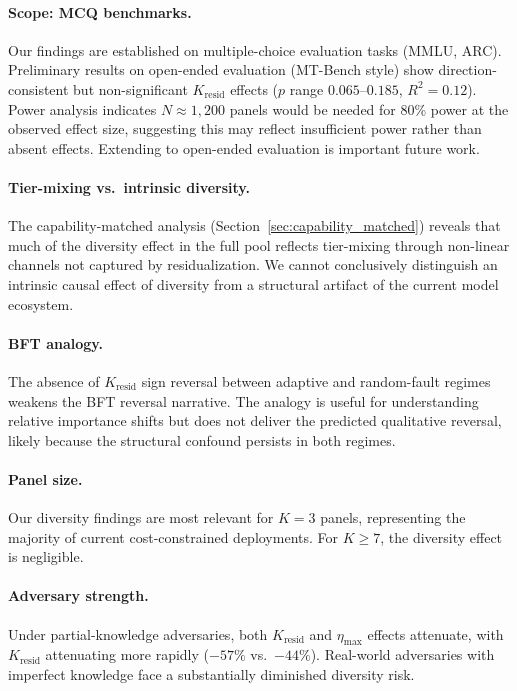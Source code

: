 \documentclass[11pt,a4paper]{article}
\newcommand{\etamax}{\eta_{\max}}
\newcommand{\kresid}{K_{\text{resid}}}
\begin{document}
\paragraph{Scope: MCQ benchmarks.} Our findings are established on multiple-choice evaluation tasks (MMLU, ARC). Preliminary results on open-ended evaluation (MT-Bench style) show direction-consistent but non-significant $\kresid$ effects ($p$ range $0.065$--$0.185$, $R^2 = 0.12$). Power analysis indicates $N \approx 1{,}200$ panels would be needed for 80\% power at the observed effect size, suggesting this may reflect insufficient power rather than absent effects. Extending to open-ended evaluation is important future work.

\paragraph{Tier-mixing vs.\ intrinsic diversity.} The capability-matched analysis (Section~\ref{sec:capability_matched}) reveals that much of the diversity effect in the full pool reflects tier-mixing through non-linear channels not captured by residualization. We cannot conclusively distinguish an intrinsic causal effect of diversity from a structural artifact of the current model ecosystem.

\paragraph{BFT analogy.} The absence of $\kresid$ sign reversal between adaptive and random-fault regimes weakens the BFT reversal narrative. The analogy is useful for understanding relative importance shifts but does not deliver the predicted qualitative reversal, likely because the structural confound persists in both regimes.

\paragraph{Panel size.} Our diversity findings are most relevant for $K=3$ panels, representing the majority of current cost-constrained deployments. For $K \geq 7$, the diversity effect is negligible.

\paragraph{Adversary strength.} Under partial-knowledge adversaries, both $\kresid$ and $\etamax$ effects attenuate, with $\kresid$ attenuating more rapidly ($-57\%$ vs.\ $-44\%$). Real-world adversaries with imperfect knowledge face a substantially diminished diversity risk.
\end{document}

